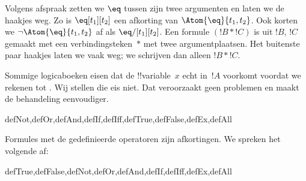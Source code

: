 \documentclass[openany]{memoir}
\begin{document}
Volgens afspraak zetten we $\eq$ tussen zijn twee argumenten en laten
we de haakjes weg. Zo is $\eq[t_1][t_2]$ een afkorting van
$\Atom{\eq}{t_1,t_2}$. Ook korten we $\lnot \Atom{\eq}{t_1,t_2}$ af
als $\eq/[t_1][t_2]$. Een formule $(!B \ast !C)$ is uit $!B$, $!C$
gemaakt met een verbindingsteken~$\ast$ met twee argumentplaatsen. Het
buitenste paar haakjes laten we vaak weg; we schrijven dan alleen
$!B \ast !C$.

\begin{intro}
Sommige logicaboeken eisen dat de !!{variable}~$x$ echt in~$!A$
voorkomt voordat we
%
%
%
rekenen tot
.
Wij stellen die eis niet. Dat veroorzaakt geen problemen en maakt de
behandeling eenvoudiger.
\end{intro}

\begin{tagblock}{defNot,defOr,defAnd,defIf,defIff,defTrue,defFalse,defEx,defAll}
\begin{defn}
Formules met de gedefinieerde operatoren zijn afkortingen. We spreken
het volgende af:

\begin{tagenumerate}{defTrue,defFalse,defNot,defOr,defAnd,defIf,defIff,defEx,defAll}









\end{tagenumerate}
\end{defn}
\end{tagblock}
\end{document}
